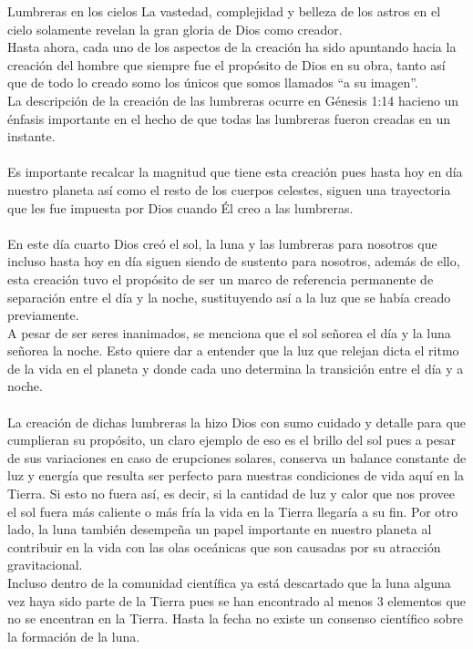 \begin{section}{Lumbreras en los cielos}
	La vastedad, complejidad y belleza de los astros en el cielo solamente revelan la gran gloria de Dios como creador.\\
	Hasta ahora, cada uno de los aspectos de la creación ha sido apuntando hacia la creación del hombre que siempre fue el propósito de Dios en su obra, tanto así que de todo lo creado somo los únicos que somos llamados ``a su imagen''.\\
	La descripción de la creación de las lumbreras ocurre en Génesis 1:14 hacieno un énfasis importante en el hecho de que todas las lumbreras fueron creadas en un instante.\\
	\\
	Es importante recalcar la magnitud que tiene esta creación pues hasta hoy en día nuestro planeta así como el resto de los cuerpos celestes, siguen una trayectoria que les fue impuesta por Dios cuando Él creo a las lumbreras.\\
	\\
	En este día cuarto  Dios creó el sol, la luna y las lumbreras para nosotros que incluso hasta hoy en día siguen siendo de sustento para nosotros, además de ello, esta creación tuvo el propósito de ser un marco de referencia permanente de separación entre el día y la noche, sustituyendo así a la luz que se había creado previamente.\\
	A pesar de ser seres inanimados, se menciona que el sol señorea el día y la luna señorea la noche. Esto quiere dar a entender que la luz que relejan dicta el ritmo de la vida en el planeta y donde cada uno determina la transición entre el día y a noche.\\
	\\
	La creación de dichas lumbreras la hizo Dios con sumo cuidado y detalle para que cumplieran su propósito, un claro ejemplo de eso es el brillo del sol pues a pesar de sus variaciones en caso de erupciones solares, conserva un balance constante de luz y energía que resulta ser perfecto para nuestras condiciones de vida aquí en la Tierra. Si esto no fuera así, es decir, si la cantidad de luz y calor que nos provee el sol fuera más caliente o más fría la vida en la Tierra llegaría a su fin. Por otro lado, la luna también desempeña un papel importante en nuestro planeta al contribuir en la vida con las olas oceánicas  que son causadas por su atracción gravitacional.\\
	Incluso dentro de la comunidad científica ya está descartado que la luna alguna vez haya sido parte de la Tierra pues se han encontrado al menos 3 elementos que no se encentran en la Tierra. Hasta la fecha no existe un consenso científico sobre la formación de la luna.\\

\end{section}
